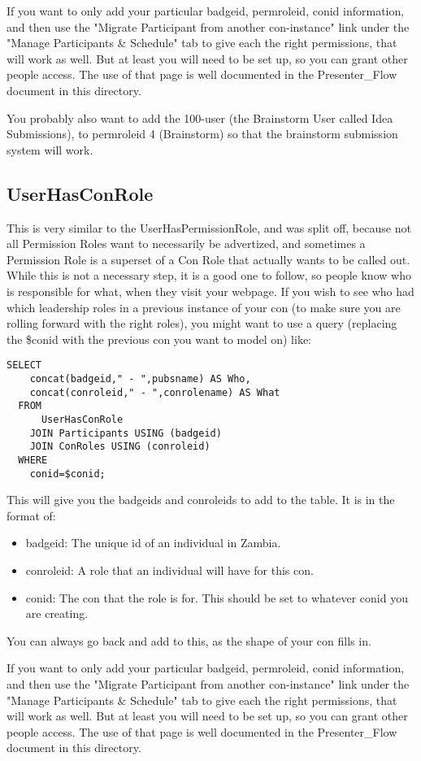\documentclass[captions=tablesignature]{scrartcl}
\begin{document}
If you want to only add your particular badgeid, permroleid, conid
information, and then use the "Migrate Participant from another
con-instance" link under the "Manage Participants \& Schedule" tab 
to give each the right permissions, that will work as well.  But at
least you will need to be set up, so you can grant other people
access.  The use of that page is well documented in the
Presenter\_Flow document in this directory.

You probably also want to add the 100-user (the Brainstorm User
called Idea Submissions), to permroleid 4 (Brainstorm) so that the
brainstorm submission system will work.

\subsection{UserHasConRole}
\label{sec-12-2}
This is very similar to the UserHasPermissionRole, and was split
off, because not all Permission Roles want to necessarily be
advertized, and sometimes a Permission Role is a superset of a Con
Role that actually wants to be called out.  While this is not a
necessary step, it is a good one to follow, so people know who is
responsible for what, when they visit your webpage. If you wish to
see who had which leadership roles in a previous instance of your
con (to make sure you are rolling forward with the right roles),
you might want to use a query (replacing the \$conid with the
previous con you want to model on) like:
\begin{verbatim}
SELECT
    concat(badgeid," - ",pubsname) AS Who,
    concat(conroleid," - ",conrolename) AS What
  FROM
      UserHasConRole
    JOIN Participants USING (badgeid)
    JOIN ConRoles USING (conroleid)
  WHERE
    conid=$conid;
\end{verbatim}
This will give you the badgeids and conroleids to add to the
table.  It is in the format of:
\begin{itemize}
\item badgeid: The unique id of an individual in Zambia.
\item conroleid: A role that an individual will have for this con.
\item conid: The con that the role is for.  This should be set to
whatever conid you are creating.
\end{itemize}

You can always go back and add to this, as the shape of your con
fills in.

If you want to only add your particular badgeid, permroleid, conid
information, and then use the "Migrate Participant from another
con-instance" link under the "Manage Participants \& Schedule" tab 
to give each the right permissions, that will work as well.  But at
least you will need to be set up, so you can grant other people
access.  The use of that page is well documented in the
Presenter\_Flow document in this directory.
\end{document}
